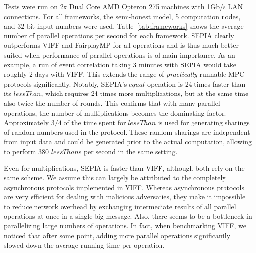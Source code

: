 \documentclass[letterpaper,11pt,onecolumn,titlepage]{article}
\begin{document}
Tests were run on 2x Dual Core AMD Opteron 275 machines with 1Gb/s LAN connections. For all frameworks, the semi-honest model, 5 computation nodes, and $32$ bit input numbers were used. Table~\ref{tab:frameworks} shows the average number of parallel operations per second for each framework.
SEPIA clearly outperforms VIFF and FairplayMP for all operations and is thus much better suited when performance of parallel operations is of main importance.
As an example, a run of event correlation taking 3 minutes with SEPIA would take roughly 2 days with VIFF. This extends the range of \emph{practically} runnable MPC protocols significantly. Notably, SEPIA's $equal$ operation is 24 times faster than its $lessThan$, which requires 24 times more multiplications, but at the same time also twice the number of rounds. This confirms that with many parallel operations, the number of multiplications becomes the dominating factor.
Approximately $3/4$ of the time spent for $lessThan$ is used for generating sharings of random numbers used in the protocol. These random sharings are independent from input data and could be generated prior to the actual computation, allowing to perform 380 $lessThan$s per second in the same setting.



Even for multiplications, SEPIA is faster than VIFF, although both rely on the same scheme. We assume this can largely be attributed to the completely asynchronous protocols implemented in VIFF. Whereas asynchronous protocols are very efficient for dealing with malicious adversaries, they make it impossible
to reduce network overhead by exchanging intermediate results of all parallel operations at once in a single big message. Also, there seems to be a bottleneck in parallelizing large numbers of operations. In fact, when benchmarking VIFF, we noticed that after some point, adding more parallel operations significantly slowed down the average running time per operation. 
\end{document}
